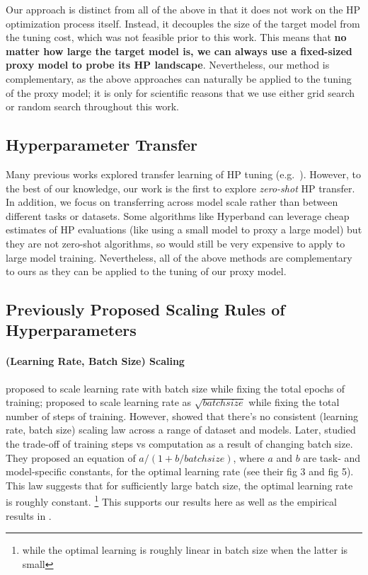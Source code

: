 \documentclass{article}
\theoremstyle{definition}
\begin{document}
Our approach is distinct from all of the above in that it does not work on the HP optimization process itself.
Instead, it decouples the size of the target model from the tuning cost, which was not feasible prior to this work.
This means that \textbf{no matter how large the target model is, we can always use a fixed-sized proxy model to probe its HP landscape}.
Nevertheless, our method is complementary, as the above approaches can naturally be applied to the tuning of the proxy model;
it is only for scientific reasons that we use either grid search or random search throughout this work.

\subsection{Hyperparameter Transfer}
\label{sec:hptransfer_related_works}
Many previous works explored transfer learning of HP tuning (e.g.\ \citep{yogatama_efficient_2014,perrone_scalable,stoll2021hyperparameter,hptransferadaptive}).
However, to the best of our knowledge, our work is the first to explore \emph{zero-shot} HP transfer.
In addition, we focus on transferring across model scale rather than between different tasks or datasets.
Some algorithms like Hyperband \citep{li_hyperband} can leverage cheap estimates of HP evaluations (like using a small model to proxy a large model) but they are not zero-shot algorithms, so would still be very expensive to apply to large model training.
Nevertheless, all of the above methods are complementary to ours as they can be applied to the tuning of our proxy model.

\subsection{Previously Proposed Scaling Rules of Hyperparameters}
\label{sec:previousscalings_appendix}
\paragraph{(Learning Rate, Batch Size) Scaling}
\citep{smith_dont_2017} proposed to scale learning rate with batch size while fixing the total epochs of training; \citep{hoffer_train_2017} proposed to scale learning rate as $\sqrt{batchsize}$ while fixing the total number of steps of training.
However, \citep{shallue_measuring_2018} showed that there's no consistent (learning rate, batch size) scaling law across a range of dataset and models.
Later, \citep{mccandlish_empirical_2018} studied the trade-off of training steps vs computation as a result of changing batch size.
They proposed an equation of $a/(1 + b / batchsize)$, where $a$ and $b$ are task- and model-specific constants, for the optimal learning rate (see their fig 3 and fig 5).
This law suggests that for sufficiently large batch size, the optimal learning rate is roughly constant.%
\footnote{while the optimal learning is roughly linear in batch size when the latter is small}
This supports our results here as well as the empirical results in \citep[fig 8]{shallue_measuring_2018}.
\end{document}

